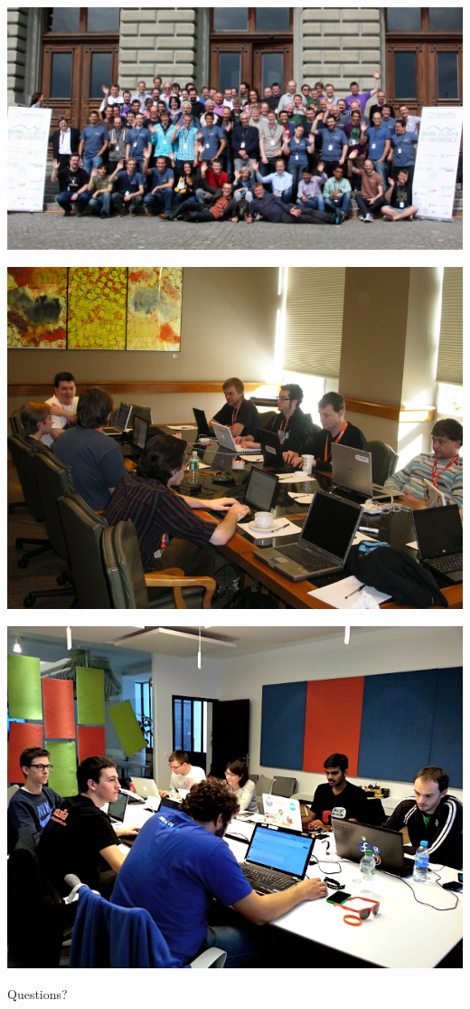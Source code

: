 \documentclass[10pt]{beamer}
\begin{document}
    \begin{frame}
        \includegraphics[width=1\textwidth]{images/community1}
    \end{frame}
    \begin{frame}
        \includegraphics[width=1\textwidth]{images/community2}
    \end{frame}
    \begin{frame}
        \includegraphics[width=1\textwidth]{images/community3}
    \end{frame}

    \begin{frame}[standout]
        \begin{Huge}
            Questions?
        \end{Huge}
    \end{frame}
\end{document}

